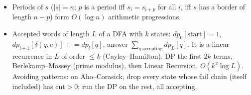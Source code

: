 \begin{itemize}
\item Periods of $s$ ($|s| = n$; $p$ is a period iff $s_i = s_{i+p}$ for all $i$, iff $s$ has a border of length $n - p$) form $O(\log n)$ arithmetic progressions.
\item Accepted words of length $L$ of a DFA with $k$ states: $dp_0[\mathrm{start}] = 1$, $dp_{l+1}[\delta(q, c)] \mathrel{+}= dp_l[q]$, answer $\sum_{q \text{ accepting}} dp_L[q]$. It is a linear recurrence in $L$ of order $\le k$ (Cayley--Hamilton). DP the first $2k$ terms, Berlekamp--Massey (prime modulus), then Linear Recursion, $O(k^2 \log L)$. Avoiding patterns: on Aho--Corasick, drop every state whose fail chain (itself included) has $\mathrm{cnt} > 0$; run the DP on the rest, all accepting.
\end{itemize}
